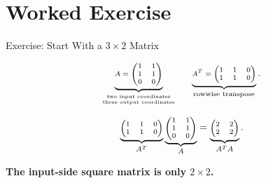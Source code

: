 \documentclass[10pt]{beamer}
\theoremstyle{definition}
\newcommand{\x}[1]{\alert{\textbf{#1}}}
\begin{document}
\section{Worked Exercise}

\begin{frame}[shrink=10]{Exercise: Start With a $3\times2$ Matrix}

\[
\scriptsize
\underbrace{
A=
\begin{pmatrix}
1&1\\
1&1\\
0&0
\end{pmatrix}}_{\substack{\text{two input coordinates}\\\text{three output coordinates}}}
\qquad
\underbrace{
A^T=
\begin{pmatrix}
1&1&0\\
1&1&0
\end{pmatrix}}_{\text{rowwise transpose}}.
\]

\vfill

\[
\scriptsize
\underbrace{
\begin{pmatrix}
1&1&0\\
1&1&0
\end{pmatrix}}_{A^T}
\underbrace{
\begin{pmatrix}
1&1\\
1&1\\
0&0
\end{pmatrix}}_{A}
=
\underbrace{
\begin{pmatrix}
2&2\\
2&2
\end{pmatrix}}_{A^TA}.
\]

\vfill

\begin{center}
\x{The input-side square matrix is only $2\times2$.}
\end{center}

\end{frame}
\end{document}
